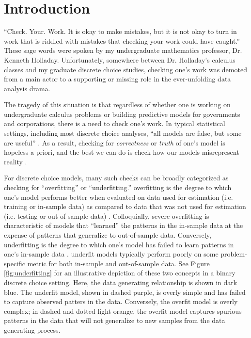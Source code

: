 \documentclass[preprint]{elsarticle}
\begin{document}
\section{Introduction}
\label{sec:intro}
``Check. Your. Work. It is okay to make mistakes, but it is not okay to turn in work that is riddled with mistakes that checking your work could have caught.'' These sage words were spoken by my undergraduate mathematics professor, Dr. Kenneth Holladay. Unfortunately, somewhere between Dr. Holladay's calculus classes and my graduate discrete choice studies, checking one's work was demoted from a main actor to a supporting or missing role in the ever-unfolding data analysis drama.

The tragedy of this situation is that regardless of whether one is working on undergraduate calculus problems or building predictive models for governments and corporations, there is a need to check one's work. In typical statistical settings, including most discrete choice analyses, ``all models are false, but some are useful'' \citep{box_science_1976}. As a result, checking for \textit{correctness} or \textit{truth} of one's model is hopeless a priori, and the best we can do is check how our models misrepresent reality \citep[pp.734, 800]{gelman_posterior_1996}.

For discrete choice models, many such checks can be broadly categorized as checking for ``overfitting'' or ``underfitting.'' overfitting is the degree to which one's model performs better when evaluated on data used for estimation (i.e. training or in-sample data) as compared to data that was not used for estimation (i.e. testing or out-of-sample data) \citep[p.6]{fariss_enhancing_2017}. Colloquially, severe overfitting is characteristic of models that ``learned'' the patterns in the in-sample data at the expense of patterns that generalize to out-of-sample data. Conversely, underfitting is the degree to which one's model has failed to learn patterns in one's in-sample data \citep[p.6]{fariss_enhancing_2017}. underfit models typically perform poorly on some problem-specific metric for both in-sample and out-of-sample data. See Figure \ref{fig:underfitting} for an illustrative depiction of these two concepts in a binary discrete choice setting. Here, the data generating relationship is shown in dark blue. The underfit model, shown in dashed purple, is overly simple and has failed to capture observed patters in the data. Conversely, the overfit model is overly complex; in dashed and dotted light orange, the overfit model captures spurious patterns in the data that will not generalize to new samples from the data generating process.
\end{document}
